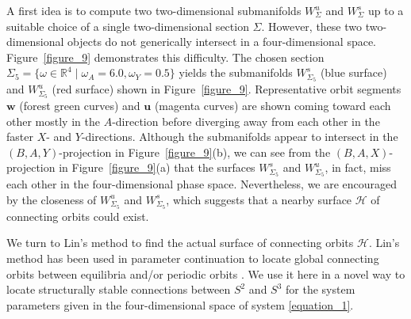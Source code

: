 \documentclass{ws-ijbc}
\begin{document}
A first idea is to compute two two-dimensional submanifolds $W^u_\Sigma$ and $W^s_\Sigma$ up to a suitable choice of a single two-dimensional section $\Sigma$.  However, these two two-dimensional objects do not generically intersect in a four-dimensional space.  Figure~\ref{figure_9} demonstrates this difficulty.  The chosen section $\Sigma_5=\{\omega \in \mathbb{R}^4 \;|\; \omega_A= 6.0, \omega_Y=0.5 \}$ yields the submanifolds $W^s_{\Sigma_5}$ (blue surface) and $W^u_{\Sigma_5}$ (red surface) shown in Figure~\ref{figure_9}.  Representative orbit segments $\mathbf{w}$ (forest green curves) and $\mathbf{u}$ (magenta curves) are shown coming toward each other mostly in the $A$-direction before diverging away from each other in the faster $X$- and $Y$-directions.  Although the submanifolds appear to intersect in the $(B,A,Y)$-projection in Figure~\ref{figure_9}(b), we can see from the $(B,A,X)$-projection in Figure~\ref{figure_9}(a) that the surfaces $W^s_{\Sigma_5}$ and $W^u_{\Sigma_5}$, in fact, miss each other in the four-dimensional phase space.  Nevertheless, we are encouraged by the closeness of $W^u_{\Sigma_5}$ and $W^s_{\Sigma_5}$, which suggests that a nearby surface $\mathscr{H}$ of connecting orbits could exist.

We turn to Lin's method to find the actual surface of connecting orbits $\mathscr{H}$.  Lin's method has been used in parameter continuation to locate global connecting orbits between equilibria and/or periodic orbits \cite{Lin_original, Lin_POs, Lin_POs2}.  We use it here in a novel way to locate structurally stable connections between $S^2$ and $S^3$ for the system parameters given in the four-dimensional space of system \eqref{equation_1}.
\end{document}
